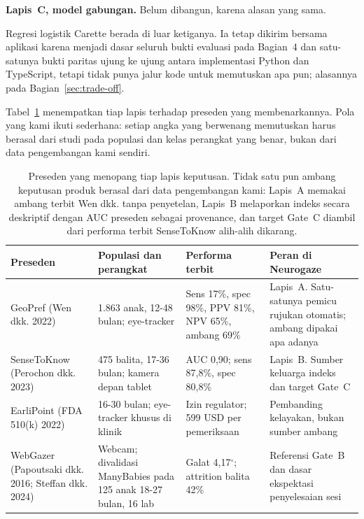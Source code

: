 \documentclass{article}
\begin{document}
\textbf{Lapis~C, model gabungan.} Belum dibangun, karena alasan yang sama.

Regresi logistik Carette berada di luar ketiganya. Ia tetap dikirim bersama aplikasi karena
menjadi dasar seluruh bukti evaluasi pada Bagian~4 dan satu-satunya bukti paritas ujung ke
ujung antara implementasi Python dan TypeScript, tetapi tidak punya jalur kode untuk
memutuskan apa pun; alasannya pada Bagian~\ref{sec:trade-off}.

Tabel~\ref{tab:preseden} menempatkan tiap lapis terhadap preseden yang membenarkannya. Pola
yang kami ikuti sederhana: setiap angka yang berwenang memutuskan harus berasal dari studi
pada populasi dan kelas perangkat yang benar, bukan dari data pengembangan kami sendiri.

\begin{table}[h]
\begin{center}
\small
\begin{tabular}{p{2.1cm}p{3.0cm}p{3.0cm}p{3.4cm}}
\toprule
\textbf{Preseden} & \textbf{Populasi dan perangkat} & \textbf{Performa terbit} &
\textbf{Peran di Neurogaze} \\
\midrule
GeoPref \newline (Wen dkk. 2022) & 1.863 anak, 12-48 bulan; eye-tracker & Sens 17\%,
spec 98\%, PPV 81\%, NPV 65\%, ambang 69\% & Lapis~A. Satu-satunya pemicu rujukan otomatis;
ambang dipakai apa adanya \\
\addlinespace
SenseToKnow \newline (Perochon dkk. 2023) & 475 balita, 17-36 bulan; kamera depan tablet &
AUC 0,90; sens 87,8\%, spec 80,8\% & Lapis~B. Sumber keluarga indeks dan target Gate~C \\
\addlinespace
EarliPoint \newline (FDA 510(k) 2022) & 16-30 bulan; eye-tracker khusus di klinik &
Izin regulator; 599 USD per pemeriksaan & Pembanding kelayakan, bukan sumber ambang \\
\addlinespace
WebGazer \newline (Papoutsaki dkk. 2016; Steffan dkk. 2024) & Webcam; divalidasi
ManyBabies pada 125 anak 18-27 bulan, 16 lab & Galat 4,17$^\circ$; attrition balita 42\% &
Referensi Gate~B dan dasar ekspektasi penyelesaian sesi \\
\bottomrule
\end{tabular}
\end{center}
\caption{Preseden yang menopang tiap lapis keputusan. Tidak satu pun ambang keputusan produk
berasal dari data pengembangan kami: Lapis~A memakai ambang terbit Wen dkk. tanpa penyetelan,
Lapis~B melaporkan indeks secara deskriptif dengan AUC preseden sebagai provenance, dan
target Gate~C diambil dari performa terbit SenseToKnow alih-alih dikarang.}
\label{tab:preseden}
\end{table}
\end{document}
